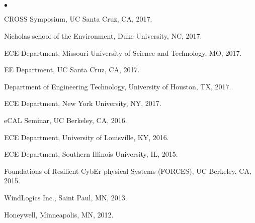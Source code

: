 \documentclass[margin,line]{res}
\newenvironment{list2}{
  \begin{list}{$\bullet$}{%
      \setlength{\itemsep}{0in}
      \setlength{\parsep}{0in} \setlength{\parskip}{0in}
      \setlength{\topsep}{0in} \setlength{\partopsep}{0in}
      \setlength{\leftmargin}{0.10in}}}{\end{list}}
\begin{document}
\begin{resume}
\vspace{.3cm}


\section{}

\vspace{.2cm}

\begin{list2}

\item   CROSS Symposium, UC Santa Cruz, CA, 2017. 
\item   Nicholas school of the Environment, Duke University, NC, 2017.
\item   ECE Department, Missouri University of Science and Technology, MO, 2017.
\item   EE Department, UC Santa Cruz, CA, 2017.        
\item   Department of Engineering Technology, University of Houston, TX, 2017.
\item   ECE Department, New York University, NY, 2017.   
\item   eCAL Seminar, UC Berkeley, CA, 2016.
\item   ECE Department, University of Louisville, KY, 2016.            
\item   ECE Department, Southern Illinois University, IL, 2015.
\item   Foundations of Resilient CybEr-physical Systems (FORCES), UC Berkeley, CA, 2015.
\item   WindLogics Inc., Saint Paul, MN, 2013.
\item   Honeywell, Minneapolis, MN, 2012.
\end{list2}

\vspace{.3cm}




\end{resume}
\end{document}
